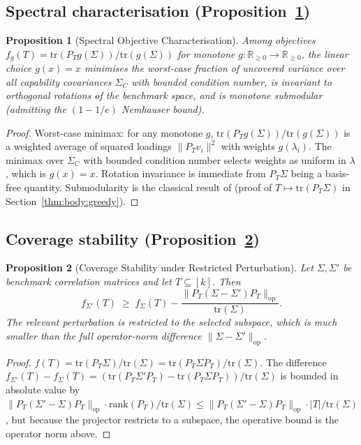 \documentclass{article}
\newtheorem{proposition}{Proposition}
\begin{document}
\subsection*{Spectral characterisation (Proposition~\ref{prop:body:spectral})}

\begin{proposition}[Spectral Objective Characterisation]
\label{prop:body:spectral}
Among objectives $f_g(T) = \mathrm{tr}(P_T g(\Sigma)) /
\mathrm{tr}(g(\Sigma))$ for monotone $g : \mathbb{R}_{\ge 0} \to
\mathbb{R}_{\ge 0}$, the linear choice $g(x) = x$ minimises the
worst-case fraction of uncovered variance over all capability
covariances $\Sigma_C$ with bounded condition number, is invariant to
orthogonal rotations of the benchmark space, and is monotone
submodular (admitting the $(1-1/e)$ Nemhauser bound).
\end{proposition}

\begin{proof}
Worst-case minimax: for any monotone $g$, $\mathrm{tr}(P_T g(\Sigma))
/ \mathrm{tr}(g(\Sigma))$ is a weighted average of squared loadings
$\|P_T v_i\|^2$ with weights $g(\lambda_i)$. The minimax over
$\Sigma_C$ with bounded condition number selects weights as uniform
in $\lambda$, which is $g(x) = x$. Rotation invariance is immediate
from $P_T \Sigma$ being a basis-free quantity. Submodularity is the
classical result of \citet{daskempe2011submodular} (proof of
$T \mapsto \mathrm{tr}(P_T \Sigma)$ in
Section~\ref{thm:body:greedy}).
\end{proof}

\subsection*{Coverage stability (Proposition~\ref{prop:body:stability})}

\begin{proposition}[Coverage Stability under Restricted Perturbation]
\label{prop:body:stability}
Let $\Sigma, \Sigma'$ be benchmark correlation matrices and let $T
\subseteq [k]$. Then
\[
  f_{\Sigma'}(T)
  \;\ge\;
  f_\Sigma(T)
  - \frac{\| P_T (\Sigma - \Sigma') P_T \|_{\mathrm{op}}}
         {\mathrm{tr}(\Sigma)}.
\]
The relevant perturbation is restricted to the selected subspace,
which is much smaller than the full operator-norm difference $\|\Sigma -
\Sigma'\|_{\mathrm{op}}$.
\end{proposition}

\begin{proof}
$f(T) = \mathrm{tr}(P_T \Sigma) / \mathrm{tr}(\Sigma) = \mathrm{tr}(P_T
\Sigma P_T) / \mathrm{tr}(\Sigma)$. The difference
$f_{\Sigma'}(T) - f_\Sigma(T) = (\mathrm{tr}(P_T \Sigma' P_T) -
\mathrm{tr}(P_T \Sigma P_T)) / \mathrm{tr}(\Sigma)$ is bounded in
absolute value by $\|P_T(\Sigma' - \Sigma)P_T\|_{\mathrm{op}} \cdot
\mathrm{rank}(P_T) / \mathrm{tr}(\Sigma) \le \|P_T(\Sigma' -
\Sigma)P_T\|_{\mathrm{op}} \cdot |T| / \mathrm{tr}(\Sigma)$, but
because the projector restricts to a subspace, the operative bound
is the operator norm above.
\end{proof}
\end{document}
